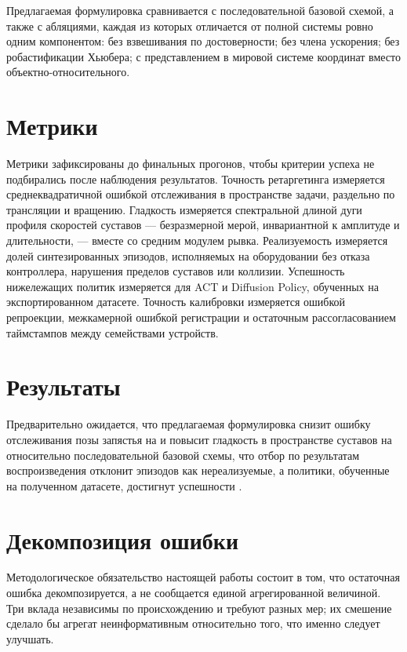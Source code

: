 \documentclass[12pt, a4paper, oneside]{report}
\begin{document}
Предлагаемая формулировка сравнивается с последовательной базовой схемой, а
также с абляциями, каждая из которых отличается от полной системы ровно одним
компонентом: без взвешивания по достоверности; без члена ускорения; без
робастификации Хьюбера; с представлением в мировой системе координат вместо
объектно-относительного.

\section{Метрики}

Метрики зафиксированы до финальных прогонов, чтобы критерии успеха не
подбирались после наблюдения результатов. Точность ретаргетинга измеряется
среднеквадратичной ошибкой отслеживания в пространстве задачи, раздельно по
трансляции и вращению. Гладкость измеряется спектральной длиной дуги профиля
скоростей суставов --- безразмерной мерой, инвариантной к амплитуде и
длительности, --- вместе со средним модулем рывка. Реализуемость измеряется
долей синтезированных эпизодов, исполняемых на оборудовании без отказа
контроллера, нарушения пределов суставов или коллизии. Успешность нижележащих
политик измеряется для ACT и Diffusion Policy, обученных на экспортированном
датасете. Точность калибровки измеряется ошибкой репроекции, межкамерной
ошибкой регистрации и остаточным рассогласованием таймстампов между семействами
устройств.

\section{Результаты}


Предварительно ожидается, что предлагаемая формулировка снизит ошибку
отслеживания позы запястья на  и повысит гладкость в пространстве
суставов на  относительно последовательной базовой схемы, что отбор по
результатам воспроизведения отклонит  эпизодов как нереализуемые, а
политики, обученные на полученном датасете, достигнут успешности .

\section{Декомпозиция ошибки}

Методологическое обязательство настоящей работы состоит в том, что остаточная
ошибка декомпозируется, а не сообщается единой агрегированной величиной. Три
вклада независимы по происхождению и требуют разных мер; их смешение сделало бы
агрегат неинформативным относительно того, что именно следует улучшать.
\end{document}

